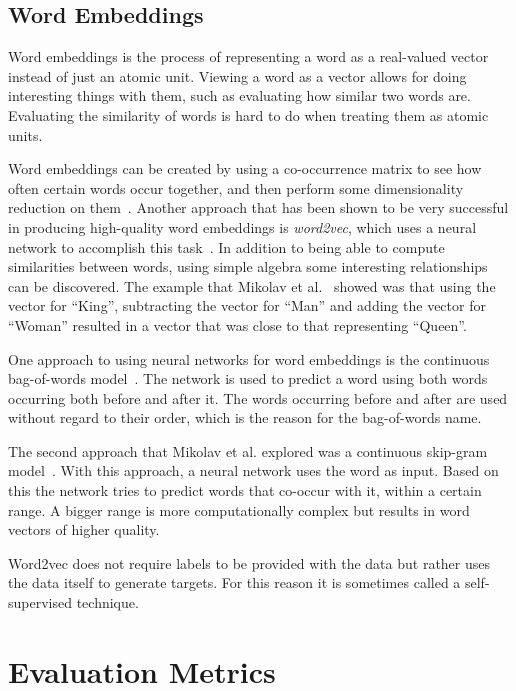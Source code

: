\subsection{Word Embeddings}

Word embeddings is the process of representing a word as a real-valued vector instead of just an atomic unit.
Viewing a word as a vector allows for doing interesting things with them, such as evaluating how similar two words are.
Evaluating the similarity of words is hard to do when treating them as atomic units.

Word embeddings can be created by using a co-occurrence matrix to see how often certain words occur together, and then perform some dimensionality reduction on them~\cite{lebret2013word, levy2014neural}.
Another approach that has been shown to be very successful in producing high-quality word embeddings is \textit{word2vec}, which uses a neural network to accomplish this task~\cite{mikolov2013efficient}.
In addition to being able to compute similarities between words, using simple algebra some interesting relationships can be discovered.
The example that Mikolav et al\@.~\cite{mikolov2013efficient} showed was that using the vector for ``King'', subtracting the vector for ``Man'' and adding the vector for ``Woman'' resulted in a vector that was close to that representing ``Queen''.

One approach to using neural networks for word embeddings is the continuous bag-of-words model~\cite{mikolov2013efficient}.
The network is used to predict a word using both words occurring both before and after it.
The words occurring before and after are used without regard to their order, which is the reason for the bag-of-words name.

The second approach that Mikolav et al\@. explored was a continuous skip-gram model~\cite{mikolov2013efficient}.
With this approach, a neural network uses the word as input. 
Based on this the network tries to predict words that co-occur with it, within a certain range.
A bigger range is more computationally complex but results in word vectors of higher quality.

Word2vec does not require labels to be provided with the data but rather uses the data itself to generate targets.
For this reason it is sometimes called a self-supervised technique.

\section{Evaluation Metrics}\label{sec:evaluation-metrics}

